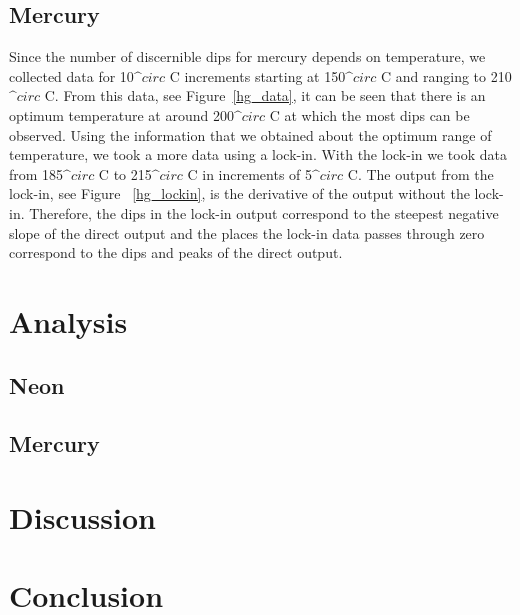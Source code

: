 \documentclass[prb,preprint]{revtex4-1}
\begin{document}
\subsection{Mercury}

Since the number of discernible dips for mercury depends on temperature, we collected data for 10$\^{circ}$ C increments starting at 150$\^{circ}$ C and ranging to 210$\^{circ}$ C. From this data, see Figure~\ref{hg_data}, it can be seen that there is an optimum temperature at around 200$\^{circ}$ C at which the most dips can be observed. Using the information that we obtained about the optimum range of temperature, we took a more data using a lock-in. With the lock-in we took data from 185$\^{circ}$ C to 215$\^{circ}$ C in increments of 5$\^{circ}$ C. The output from the lock-in, see Figure ~\ref{hg_lockin}, is the derivative of the output without the lock-in. Therefore, the dips in the lock-in output correspond to the steepest negative slope of the direct output and the places the lock-in data passes through zero correspond to the dips and peaks of the direct output.

\section{Analysis}

\subsection{Neon}
\subsection{Mercury}

\section{Discussion}


\section{Conclusion}
\end{document}
